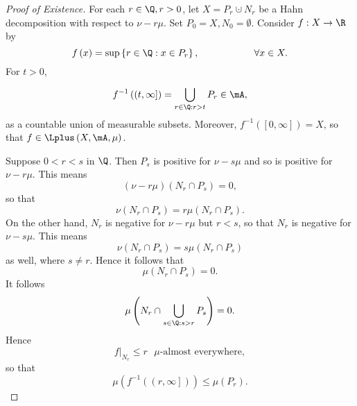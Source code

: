 \documentclass[pmath451]{subfiles}
\begin{document}
    \begin{proof}[Proof of Existence]\qedplacedtrue
        For each $r\in\Q,r>0$, let $X=P_r\cupdot N_r$ be a Hahn decomposition with respect to $\nu-r\mu$. Set $P_0 = X, N_0 = \emptyset$. Consider $f:X\to\R$ by
        \begin{equation*}
            f\left( x \right) = \sup\left\lbrace r\in\Q: x\in P_r \right\rbrace, \hspace{2cm}\forall x\in X.
        \end{equation*}
        For $t>0$,
        \begin{equation*}
            f^{-1}\left( \left( t,\infty \right] \right) = \bigcup^{}_{r\in\Q: r>t} P_r\in\mA,
        \end{equation*}
        as a countable union of measurable subsets. Moreover, $f^{-1}\left( \left[ 0,\infty \right] \right) = X$, so that $f\in\Lplus\left( X,\mA,\mu \right)$.

        Suppose $0<r<s$ in $\Q$. Then $P_s$ is positive for $\nu-s\mu$ and so is positive for $\nu-r\mu$. This means
        \begin{equation*}
            \left( \nu-r\mu \right) \left( N_r\cap P_s \right) = 0,
        \end{equation*}
        so that
        \begin{equation*}
            \nu\left( N_r\cap P_s \right) = r\mu\left( N_r\cap P_s \right).
        \end{equation*}
        On the other hand, $N_r$ is negative for $\nu-r\mu$ but $r<s$, so that $N_r$ is negative for $\nu-s\mu$. This means
        \begin{equation*}
            \nu\left( N_r\cap P_s \right) = s\mu\left( N_r\cap P_s \right)
        \end{equation*}
        as well, where $s\neq r$. Hence it follows that
        \begin{equation*}
            \mu\left( N_r\cap P_s \right) = 0.
        \end{equation*}
        It follows
        \begin{equation*}
            \mu\left( N_r\cap \bigcup^{}_{s\in\Q:s>r} P_s \right) = 0.
        \end{equation*}
        Hence
        \begin{equation*}
            f|_{N_r} \leq r \text{ $\mu$-almost everywhere},
        \end{equation*}
        so that
        \begin{equation*}
            \mu\left( f^{-1}\left( \left( r,\infty \right] \right) \right) \leq \mu\left( P_r \right).
        \end{equation*}


\end{proof}
\end{document}
